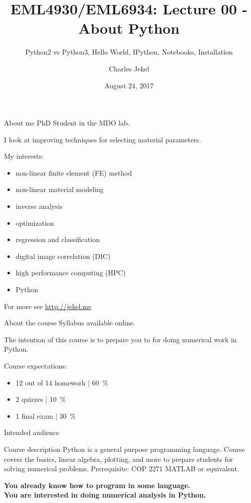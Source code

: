 \documentclass[10pt]{beamer}
\title{EML4930/EML6934: Lecture 00 - About Python }
\subtitle{Python2 vs Python3, Hello World, IPython, Notebooks, Installation}
\date{August 24, 2017}
\author{Charles Jekel}
\begin{document}
\maketitle

\begin{frame}{About me}
PhD Student in the MDO lab. 

I look at improving techniques for selecting material parameters.

My interests:
\begin{itemize}
\item non-linear finite element (FE) method
\item non-linear material modeling
\item inverse analysis
\item optimization
\item regression and classification
\item digital image correlation (DIC)
\item high performance computing (HPC)
\item Python
\end{itemize}

For more see \url{http://jekel.me}

\end{frame}

\begin{frame}{About the course}
Syllabus available online.

The intention of this course is to prepare you to for doing numerical work in Python.

Course expectations:
\begin{itemize}
\item 12 out of 14 homework | 60~\%
\item 2 quizzes | 10~\%
\item 1 final exam | 30~\%
\end{itemize}


\end{frame}

\begin{frame}{Intended audience}
	\begin{alertblock}{Course description}
Python is a general purpose programming language. Course covers the basics, linear algebra, plotting, and more to prepare students for solving numerical problems. Prerequisite: COP 2271 MATLAB or equivalent.
	\end{alertblock}

\textbf{You already know how to program in some language. \\
You are interested in doing numerical analysis in Python.} 
\end{frame}
\end{document}
